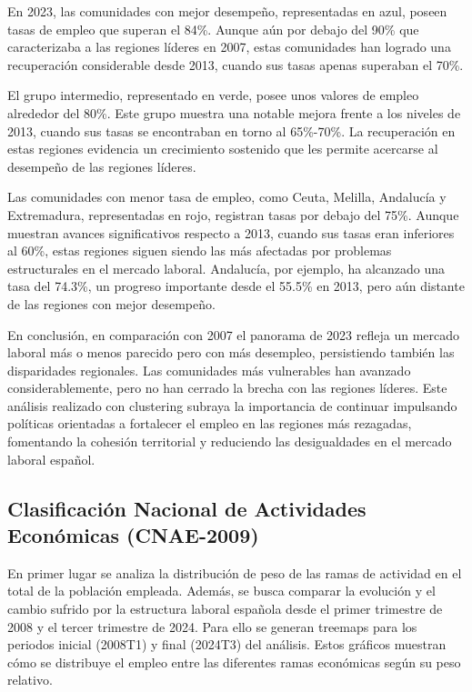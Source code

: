 \documentclass[Universitat de
València,article,submit,moreauthors,pdftex]{Definitions/mdpi}
\begin{document}
En 2023, las comunidades con mejor desempeño, representadas en azul,
poseen tasas de empleo que superan el 84\%. Aunque aún por debajo del
90\% que caracterizaba a las regiones líderes en 2007, estas comunidades
han logrado una recuperación considerable desde 2013, cuando sus tasas
apenas superaban el 70\%.

El grupo intermedio, representado en verde, posee unos valores de empleo
alrededor del 80\%. Este grupo muestra una notable mejora frente a los
niveles de 2013, cuando sus tasas se encontraban en torno al 65\%-70\%.
La recuperación en estas regiones evidencia un crecimiento sostenido que
les permite acercarse al desempeño de las regiones líderes.

Las comunidades con menor tasa de empleo, como Ceuta, Melilla, Andalucía
y Extremadura, representadas en rojo, registran tasas por debajo del
75\%. Aunque muestran avances significativos respecto a 2013, cuando sus
tasas eran inferiores al 60\%, estas regiones siguen siendo las más
afectadas por problemas estructurales en el mercado laboral. Andalucía,
por ejemplo, ha alcanzado una tasa del 74.3\%, un progreso importante
desde el 55.5\% en 2013, pero aún distante de las regiones con mejor
desempeño.

En conclusión, en comparación con 2007 el panorama de 2023 refleja un
mercado laboral más o menos parecido pero con más desempleo,
persistiendo también las disparidades regionales. Las comunidades más
vulnerables han avanzado considerablemente, pero no han cerrado la
brecha con las regiones líderes. Este análisis realizado con clustering
subraya la importancia de continuar impulsando políticas orientadas a
fortalecer el empleo en las regiones más rezagadas, fomentando la
cohesión territorial y reduciendo las desigualdades en el mercado
laboral español.

\subsection{Clasificación Nacional de Actividades Económicas
(CNAE-2009)}\label{clasificaciuxf3n-nacional-de-actividades-econuxf3micas-cnae-2009-1}

En primer lugar se analiza la distribución de peso de las ramas de
actividad en el total de la población empleada. Además, se busca
comparar la evolución y el cambio sufrido por la estructura laboral
española desde el primer trimestre de 2008 y el tercer trimestre de
2024. Para ello se generan treemaps para los periodos inicial (2008T1) y
final (2024T3) del análisis. Estos gráficos muestran cómo se distribuye
el empleo entre las diferentes ramas económicas según su peso relativo.
\end{document}
